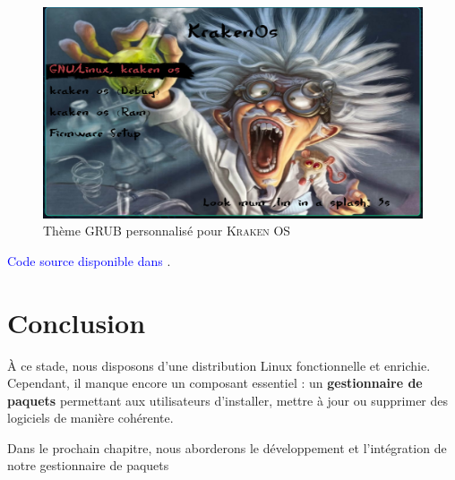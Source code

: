 \begin{figure}[H]
  \centering
  \includegraphics[width=1\textwidth]{images_pfe/grubthemekraken.png}
  \caption{Thème GRUB personnalisé pour \textsc{Kraken OS}}
  \label{fig:grub-custom}
\end{figure}

\textcolor{blue}{Code source disponible dans \cite{theme_grub}}.
\section{Conclusion}
À ce stade, nous disposons d'une distribution Linux fonctionnelle et enrichie. Cependant, il manque encore un composant essentiel : un \textbf{gestionnaire de paquets} permettant aux utilisateurs d'installer, mettre à jour ou supprimer des logiciels de manière cohérente.

Dans le prochain chapitre, nous aborderons le développement et l'intégration de notre gestionnaire de paquets 